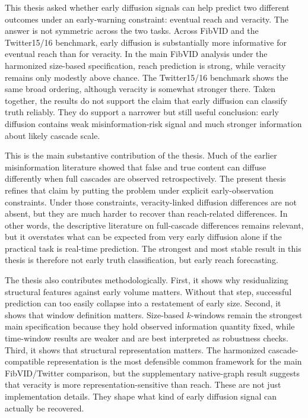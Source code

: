This thesis asked whether early diffusion signals can help predict two different outcomes under an early-warning constraint: eventual reach and veracity. The answer is not symmetric across the two tasks. Across FibVID and the Twitter15/16 benchmark, early diffusion is substantially more informative for eventual reach than for veracity. In the main FibVID analysis under the harmonized size-based specification, reach prediction is strong, while veracity remains only modestly above chance. The Twitter15/16 benchmark shows the same broad ordering, although veracity is somewhat stronger there. Taken together, the results do not support the claim that early diffusion can classify truth reliably. They do support a narrower but still useful conclusion: early diffusion contains weak misinformation-risk signal and much stronger information about likely cascade scale.

This is the main substantive contribution of the thesis. Much of the earlier misinformation literature showed that false and true content can diffuse differently when full cascades are observed retrospectively. The present thesis refines that claim by putting the problem under explicit early-observation constraints. Under those constraints, veracity-linked diffusion differences are not absent, but they are much harder to recover than reach-related differences. In other words, the descriptive literature on full-cascade differences remains relevant, but it overstates what can be expected from very early diffusion alone if the practical task is real-time prediction. The strongest and most stable result in this thesis is therefore not early truth classification, but early reach forecasting.

The thesis also contributes methodologically. First, it shows why residualizing structural features against early volume matters. Without that step, successful prediction can too easily collapse into a restatement of early size. Second, it shows that window definition matters. Size-based $k$-windows remain the strongest main specification because they hold observed information quantity fixed, while time-window results are weaker and are best interpreted as robustness checks. Third, it shows that structural representation matters. The harmonized cascade-compatible representation is the most defensible common framework for the main FibVID/Twitter comparison, but the supplementary native-graph result suggests that veracity is more representation-sensitive than reach. These are not just implementation details. They shape what kind of early diffusion signal can actually be recovered.

